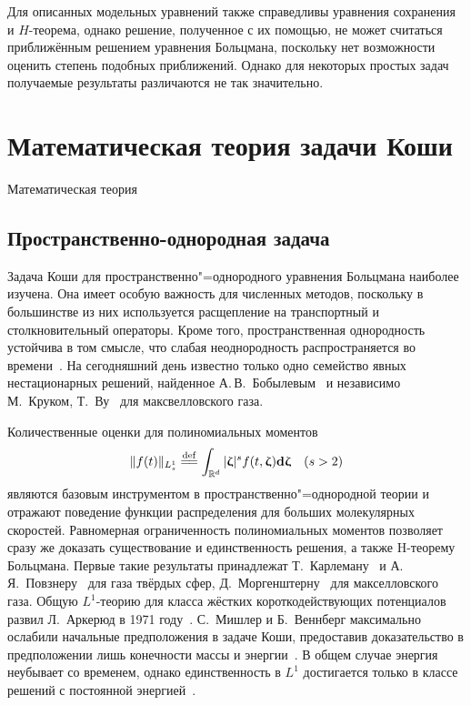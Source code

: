Для описанных модельных уравнений также справедливы уравнения сохранения и \(H\)-теорема,
однако решение, полученное с их помощью, не может считаться приближённым решением
уравнения Больцмана, поскольку нет возможности оценить степень подобных приближений.
Однако для некоторых простых задач получаемые результаты различаются не так значительно.

\section{Математическая теория задачи Коши} \label{sect:cauchy}

Математическая теория

\subsection{Пространственно-однородная задача}

Задача Коши для пространственно"=однородного уравнения Больцмана наиболее изучена.
Она имеет особую важность для численных методов, поскольку в большинстве из них используется
расщепление на транспортный и столкновительный операторы.
Кроме того, пространственная однородность устойчива в том смысле, что
слабая неоднородность распространяется во времени~\cite{Arkeryd1987}.
На сегодняшний день известно только одно семейство явных нестационарных решений,
найденное А.\,В.~Бобылевым~\cite{Bobylev1975} и независимо М.~Круком, Т.~Ву~\cite{Krook1976} для максвелловского газа.

Количественные оценки для полиномиальных моментов
\begin{equation*}
    \|f(t)\|_{L^1_s} \eqdef \int_{\mathbb{R}^d} |\bzeta|^s f(t,\bzeta)\dzeta \quad (s>2)
\end{equation*}
являются базовым инструментом в пространственно"=однородной теории
и отражают поведение функции распределения для больших молекулярных скоростей.
Равномерная ограниченность полиномиальных моментов позволяет сразу же доказать
существование и единственность решения, а также H-теорему Больцмана.
Первые такие результаты принадлежат Т.~Карлеману~\cite{Carleman1933} и А.\,Я.~Повзнеру~\cite{Povzner1962}
для газа твёрдых сфер, Д.~Моргенштерну~\cite{Morgenstern1954} для макселловского газа.
Общую \(L^1\)-теорию для класса жёстких короткодействующих потенциалов развил Л.~Аркерюд в 1971 году~\cite{Arkeryd1972}.
С.~Мишлер и Б.~Веннберг максимально ослабили начальные предположения в задаче Коши,
предоставив доказательство в предположении лишь конечности массы и энергии~\cite{Mischler1999}.
В общем случае энергия неубывает со временем, однако единственность в \(L^1\) достигается
только в классе решений с постоянной энергией~\cite{Wennberg1999}.

